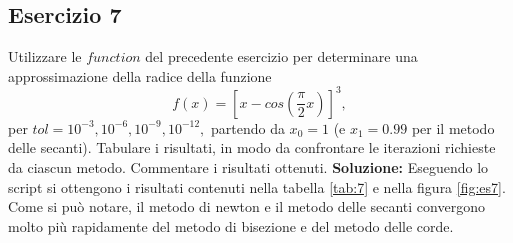 \subsection{Esercizio 7}
Utilizzare le $function$ del precedente esercizio per determinare una approssimazione
della radice della funzione
\[
        f(x) = \left[x - cos(\frac{\pi}{2}x)\right]^3,
\]
per $tol = 10^{-3}, 10^{-6}, 10^{-9}, 10^{-12},$ partendo da $x_0 = 1$
(e $x_1 = 0.99$ per il metodo delle secanti). Tabulare i risultati,
in modo da confrontare le iterazioni richieste da ciascun metodo. Commentare
i risultati ottenuti.
\newline \textbf{Soluzione:} \newline
Eseguendo lo script si ottengono i risultati contenuti nella tabella \ref{tab:7}
e nella figura \ref{fig:es7}. Come si può notare, il metodo di newton e il metodo delle secanti
convergono molto più rapidamente del metodo di bisezione e del metodo delle corde.
\begin{table}[h]
        \renewcommand\arraystretch{2}
        \caption{valori approssimati con i metodi di Newton, secanti e Steffensen}
        \label{tab:7}
\end{table}

